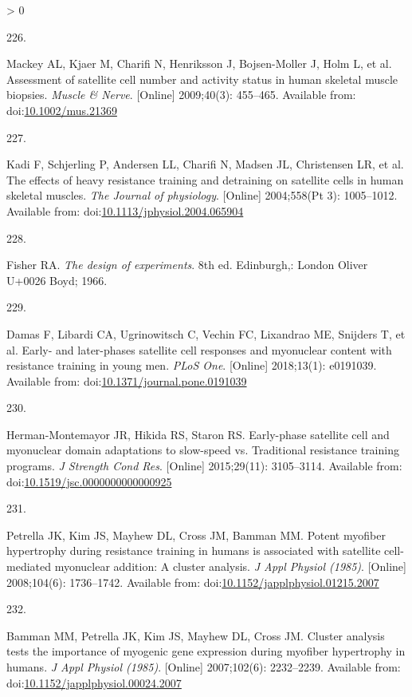 \documentclass[twoside,10pt]{gihclass} %
\newlength{\cslhangindent}
\newlength{\csllabelwidth}
\newenvironment{CSLReferences}[3] %
 {%
  \setlength{\parindent}{0pt}
  \ifodd #1 \everypar{\setlength{\hangindent}{\cslhangindent}}\ignorespaces\fi
  \ifnum #2 > 0
  \setlength{\parskip}{#2\baselineskip}
  \fi
 }%
 {}
\newcommand{\CSLLeftMargin}[1]{\parbox[t]{\maxof{\widthof{#1}}{\csllabelwidth}}{#1}}
\newcommand{\CSLRightInline}[1]{\parbox[t]{\linewidth}{#1}}
\begin{document}
\begin{CSLReferences}{0}{0}
\leavevmode\hypertarget{ref-RN2081}{}%
\CSLLeftMargin{226. }
\CSLRightInline{Mackey AL, Kjaer M, Charifi N, Henriksson J, Bojsen-Moller J, Holm L, et al. Assessment of satellite cell number and activity status in human skeletal muscle biopsies. \emph{Muscle \& Nerve}. {[}Online{]} 2009;40(3): 455--465. Available from: doi:\href{https://doi.org/10.1002/mus.21369}{10.1002/mus.21369}}

\leavevmode\hypertarget{ref-RN2617}{}%
\CSLLeftMargin{227. }
\CSLRightInline{Kadi F, Schjerling P, Andersen LL, Charifi N, Madsen JL, Christensen LR, et al. The effects of heavy resistance training and detraining on satellite cells in human skeletal muscles. \emph{The Journal of physiology}. {[}Online{]} 2004;558(Pt 3): 1005--1012. Available from: doi:\href{https://doi.org/10.1113/jphysiol.2004.065904}{10.1113/jphysiol.2004.065904}}

\leavevmode\hypertarget{ref-RN2004}{}%
\CSLLeftMargin{228. }
\CSLRightInline{Fisher RA. \emph{The design of experiments}. 8th ed. Edinburgh,: London Oliver U+0026 Boyd; 1966. }

\leavevmode\hypertarget{ref-RN2112}{}%
\CSLLeftMargin{229. }
\CSLRightInline{Damas F, Libardi CA, Ugrinowitsch C, Vechin FC, Lixandrao ME, Snijders T, et al. Early- and later-phases satellite cell responses and myonuclear content with resistance training in young men. \emph{PLoS One}. {[}Online{]} 2018;13(1): e0191039. Available from: doi:\href{https://doi.org/10.1371/journal.pone.0191039}{10.1371/journal.pone.0191039}}

\leavevmode\hypertarget{ref-RN2874}{}%
\CSLLeftMargin{230. }
\CSLRightInline{Herman-Montemayor JR, Hikida RS, Staron RS. Early-phase satellite cell and myonuclear domain adaptations to slow-speed vs. Traditional resistance training programs. \emph{J Strength Cond Res}. {[}Online{]} 2015;29(11): 3105--3114. Available from: doi:\href{https://doi.org/10.1519/jsc.0000000000000925}{10.1519/jsc.0000000000000925}}

\leavevmode\hypertarget{ref-RN2868}{}%
\CSLLeftMargin{231. }
\CSLRightInline{Petrella JK, Kim JS, Mayhew DL, Cross JM, Bamman MM. Potent myofiber hypertrophy during resistance training in humans is associated with satellite cell-mediated myonuclear addition: A cluster analysis. \emph{J Appl Physiol (1985)}. {[}Online{]} 2008;104(6): 1736--1742. Available from: doi:\href{https://doi.org/10.1152/japplphysiol.01215.2007}{10.1152/japplphysiol.01215.2007}}

\leavevmode\hypertarget{ref-RN765}{}%
\CSLLeftMargin{232. }
\CSLRightInline{Bamman MM, Petrella JK, Kim JS, Mayhew DL, Cross JM. Cluster analysis tests the importance of myogenic gene expression during myofiber hypertrophy in humans. \emph{J Appl Physiol (1985)}. {[}Online{]} 2007;102(6): 2232--2239. Available from: doi:\href{https://doi.org/10.1152/japplphysiol.00024.2007}{10.1152/japplphysiol.00024.2007}}


\end{CSLReferences}
\end{document}
